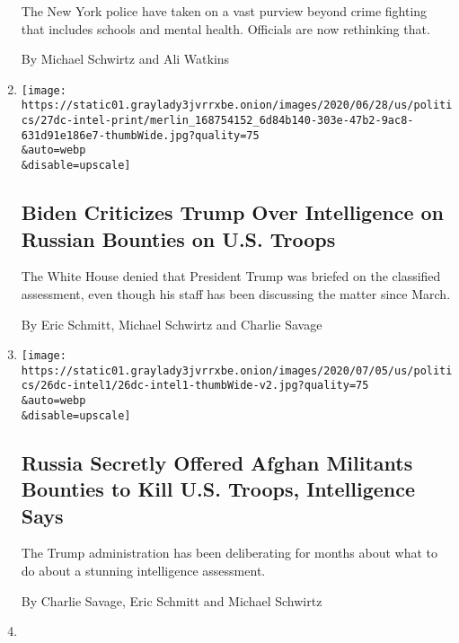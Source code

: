 \begin{enumerate}
  The New York police have taken on a vast purview beyond crime fighting
  that includes schools and mental health. Officials are now rethinking
  that.

  By Michael Schwirtz and Ali Watkins
\item
  \href{/2020/06/27/us/politics/trump-russia-bounties-afghanistan.html}{}

  \texttt{[image: https://static01.graylady3jvrrxbe.onion/images/2020/06/28/us/politics/27dc-intel-print/merlin\_168754152\_6d84b140-303e-47b2-9ac8-631d91e186e7-thumbWide.jpg?quality=75\\\&auto=webp\\\&disable=upscale]}

  \hypertarget{biden-criticizes-trump-over-intelligence-on-russian-bounties-on-us-troops}{%
  \subsection{Biden Criticizes Trump Over Intelligence on Russian
  Bounties on U.S.
  Troops}\label{biden-criticizes-trump-over-intelligence-on-russian-bounties-on-us-troops}}

  The White House denied that President Trump was briefed on the
  classified assessment, even though his staff has been discussing the
  matter since March.

  By Eric Schmitt, Michael Schwirtz and Charlie Savage
\item
  \href{/2020/06/26/us/politics/russia-afghanistan-bounties.html}{}

  \texttt{[image: https://static01.graylady3jvrrxbe.onion/images/2020/07/05/us/politics/26dc-intel1/26dc-intel1-thumbWide-v2.jpg?quality=75\\\&auto=webp\\\&disable=upscale]}

  \hypertarget{russia-secretly-offered-afghan-militants-bounties-to-kill-us-troops-intelligence-says}{%
  \subsection{Russia Secretly Offered Afghan Militants Bounties to Kill
  U.S. Troops, Intelligence
  Says}\label{russia-secretly-offered-afghan-militants-bounties-to-kill-us-troops-intelligence-says}}

  The Trump administration has been deliberating for months about what
  to do about a stunning intelligence assessment.

  By Charlie Savage, Eric Schmitt and Michael Schwirtz
\item
  \href{/2020/05/18/nyregion/coronavirus-deaths-nyc.html}{}


\end{enumerate}
